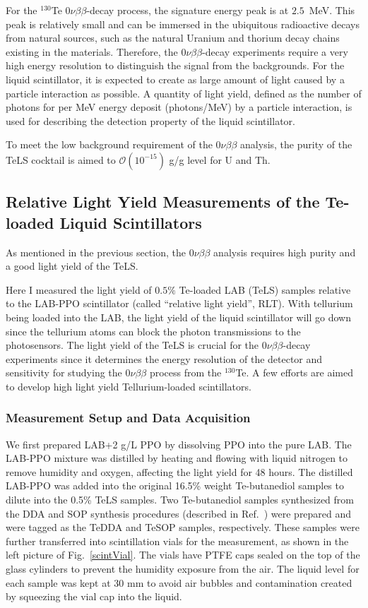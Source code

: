 For the $^{130}${Te} $0\nu\beta\beta$-decay process, the signature energy peak is at $2.5$~MeV\cite{whitepaper}. This peak is relatively small and can be immersed in the ubiquitous radioactive decays from natural sources, such as the natural Uranium and thorium decay chains existing in the materials\cite{whitepaper}. Therefore, the $0\nu\beta\beta$-decay experiments require a very high energy resolution to distinguish the signal from the backgrounds. For the liquid scintillator, it is expected to create as large amount of light caused by a particle interaction as possible. A quantity of light yield, defined as the number of photons for per MeV energy deposit (photons/MeV) by a particle interaction, is used for describing the detection property of the liquid scintillator.

To meet the low background requirement of the $0\nu\beta\beta$ analysis, the purity of the TeLS cocktail is aimed to $\mathcal{O}(10^{-15})$ g/g level for U and Th. 

\subsection{Relative Light Yield Measurements of the Te-loaded Liquid Scintillators}
As mentioned in the previous section, the $0\nu\beta\beta$ analysis requires high purity and a good light yield of the TeLS. %

Here I measured the light yield of $0.5\%$ Te-loaded LAB (TeLS) samples relative to the LAB-PPO scintillator (called ``relative light yield'', RLT). With tellurium being loaded into the LAB, the light yield of the liquid scintillator will go down since the tellurium atoms can block the photon transmissions to the photosensors. The light yield of the TeLS is crucial for the $0\nu\beta\beta$-decay experiments since it determines the energy resolution of the detector and sensitivity for studying the $0\nu\beta\beta$ process from the $^{130}$Te. A few efforts are aimed to develop high light yield Tellurium-loaded scintillators\cite{biller2017new}.

\subsubsection{Measurement Setup and Data Acquisition}

We first prepared LAB+2 g/L PPO by dissolving PPO into the pure LAB. The LAB-PPO mixture was distilled by heating and flowing with liquid nitrogen to remove humidity and oxygen, affecting the light yield for 48 hours. The distilled LAB-PPO was added into the original 16.5\% weight Te-butanediol samples to dilute into the 0.5\% TeLS samples. Two Te-butanediol samples synthesized from the DDA and SOP synthesis procedures (described in Ref.~\cite{teLoadingPaper}) were prepared and were tagged as the TeDDA and TeSOP samples, respectively. These samples were further transferred into scintillation vials for the measurement, as shown in the left picture of Fig.~\ref{scintVial}. The vials have PTFE caps sealed on the top of the glass cylinders to prevent the humidity exposure from the air. The liquid level for each sample was kept at 30 mm to avoid air bubbles and contamination created by squeezing the vial cap into the liquid.

